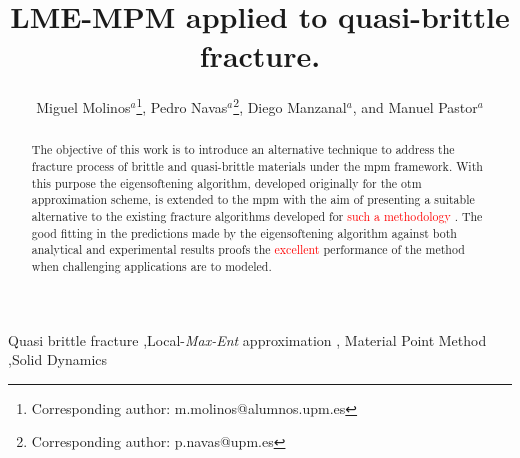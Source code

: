 \documentclass[preprint,12pt,a4paper]{elsarticle}
\newcommand{\PNA}[1]{
  \textcolor{red}{{#1}}
}
\begin{document}
\begin{frontmatter}

\title{LME-MPM applied to quasi-brittle fracture.}


\author{
Miguel Molinos$^a$\footnote{Corresponding author: m.molinos@alumnos.upm.es},
Pedro Navas$^a$\footnote{Corresponding author: p.navas@upm.es},
Diego Manzanal$^a$,
and Manuel Pastor$^a$
 }
 \address{
 $^a$ ETSI Caminos, Canales y Puertos, Universidad Polit\'ectnica de Madrid.\\
 c. Prof. Aranguren 3, 28040 Madrid, Spain
}

\begin{abstract}
  The objective of this work is to introduce an alternative
  technique to address the fracture process of brittle and
  quasi-brittle materials under the \acrfull{mpm} 
  framework. With this purpose the eigensoftening algorithm, developed
  originally for the \acrfull{otm} approximation scheme, is extended
  to the \acrshort{mpm} with the aim of presenting a suitable alternative
  to the existing fracture algorithms developed for \PNA{such a methodology}.
  The good fitting in the predictions made by the
  eigensoftening algorithm against both analytical and experimental
  results proofs the \PNA{excellent} performance of the method when challenging
  applications are to modeled.
\end{abstract}

\begin{keyword}
Quasi brittle fracture \sep Local-\textit{Max-Ent} approximation \sep
Material Point Method \sep Solid Dynamics
\end{keyword}

\end{frontmatter}

\linenumbers

\end{document}
